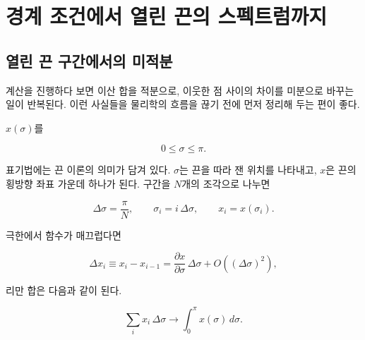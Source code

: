 \chapter{경계 조건에서 열린 끈의 스펙트럼까지}


\section{열린 끈 구간에서의 미적분}

계산을 진행하다 보면 이산 합을 적분으로, 이웃한 점 사이의 차이를 미분으로 바꾸는 일이 반복된다. 이런 사실들을 물리학의 흐름을 끊기 전에 먼저 정리해 두는 편이 좋다.

\(x(\sigma)\)를

\begin{equation}
  0\leq \sigma\leq \pi .
\end{equation}

표기법에는 끈 이론의 의미가 담겨 있다. \(\sigma\)는 끈을 따라 잰 위치를 나타내고, \(x\)은 끈의 횡방향 좌표 가운데 하나가 된다. 구간을 \(N\)개의 조각으로 나누면

\begin{equation}
  \Delta\sigma=\frac{\pi}{N},
  \qquad
  \sigma_i=i\,\Delta\sigma,
  \qquad
  x_i=x(\sigma_i).
  \label{eq:l02-lattice}
\end{equation}

극한에서 함수가 매끄럽다면

\begin{equation}
  \Delta x_i\equiv x_i-x_{i-1}
  =
  \frac{\partial x}{\partial\sigma}\,\Delta\sigma
  +O\!\left((\Delta\sigma)^2\right),
  \label{eq:l02-difference}
\end{equation}

리만 합은 다음과 같이 된다.

\begin{equation}
  \sum_i x_i\,\Delta\sigma
  \longrightarrow
  \int_0^\pi x(\sigma)\,d\sigma .
  \label{eq:l02-riemann}
\end{equation}

